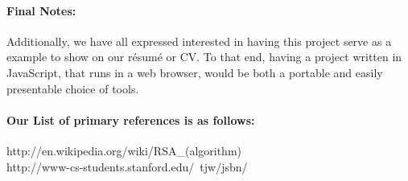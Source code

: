 \documentclass[12pt]{article}
\begin{document}
\paragraph{Final Notes:\\}
Additionally, we have all expressed interested in having this project serve as 
a example to show on our résumé or CV. To that end, having a project written in
JavaScript, that runs in a web browser, would be both a portable and easily 
presentable choice of tools.

\paragraph{Our List of primary references is as follows:\\}
http://en.wikipedia.org/wiki/RSA\_(algorithm)\\
http://www-cs-students.stanford.edu/~tjw/jsbn/
\end{document}
